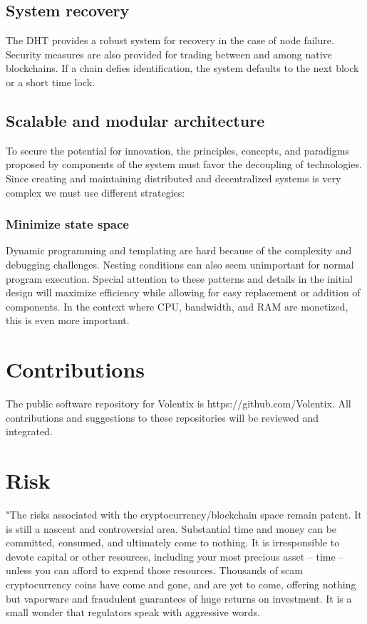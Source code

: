 \documentclass[]{article}
\begin{document}
{\subsection{System recovery}
The DHT provides a robust system for recovery in the case of node failure. Security measures are also provided for trading between and among native blockchains. If a chain defies identification, the system defaults to the next block or a short time lock. 


\subsection{Scalable and modular architecture}
To secure the potential for innovation, the principles, 
concepts, and paradigms proposed by components of the system must favor the decoupling of technologies. 
Since creating and maintaining distributed and decentralized systems
is very complex we must use different strategies: 
\subsubsection{Minimize state space}
Dynamic programming and templating are hard because of the complexity and debugging challenges. 
Nesting conditions can also seem unimportant for normal program execution.
Special attention to these patterns and details in the initial design will maximize efficiency while allowing for easy replacement or addition of components.   
In the context where CPU, bandwidth, and RAM are monetized, this is even more important. 

\section{Contributions}
The public software repository for Volentix is https://github.com/Volentix.
All contributions and suggestions to these repositories will be reviewed and integrated. 

\section{Risk}
"The risks associated with the cryptocurrency/blockchain space remain patent. It is still a nascent and controversial area. Substantial time and money can be committed, consumed, and ultimately come to nothing. It is irresponsible to devote capital or other resources, including your most precious asset -- time -- unless you can afford to expend those resources. Thousands of scam cryptocurrency coins have come and gone, and are yet to come, offering nothing but vaporware and fraudulent guarantees of huge returns on investment. It is a small wonder that regulators speak with aggressive words. 

}
\end{document}

